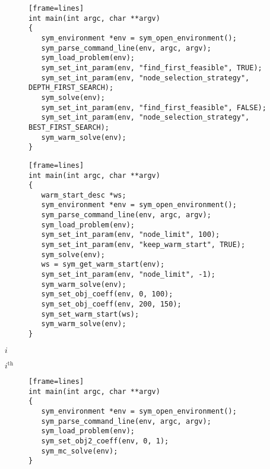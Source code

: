\documentclass[twoside,11pt]{book}
\def\lthtmlcheckvsize{\ifdim\ht\sizebox<\vsize 
  \ifdim\wd\sizebox<\hsize\expandafter\hfill\fi \expandafter\vfill
  \else\expandafter\vss\fi}%
\begin{document}
{\newpage\clearpage
{}%
\begin{figure}{\color{brown}
\begin{Verbatim}
[frame=lines]
int main(int argc, char **argv)
{
   sym_environment *env = sym_open_environment();
   sym_parse_command_line(env, argc, argv);
   sym_load_problem(env);
   sym_set_int_param(env, "find_first_feasible", TRUE);
   sym_set_int_param(env, "node_selection_strategy", DEPTH_FIRST_SEARCH);
   sym_solve(env);
   sym_set_int_param(env, "find_first_feasible", FALSE);
   sym_set_int_param(env, "node_selection_strategy", BEST_FIRST_SEARCH);
   sym_warm_solve(env);
}\end{Verbatim}

}

\end{figure}%
\lthtmlfigureZ
\lthtmlcheckvsize\clearpage}

{\newpage\clearpage
{}%
\begin{figure}{\color{brown}
\begin{Verbatim}
[frame=lines]
int main(int argc, char **argv)
{
   warm_start_desc *ws;
   sym_environment *env = sym_open_environment();
   sym_parse_command_line(env, argc, argv);
   sym_load_problem(env);
   sym_set_int_param(env, "node_limit", 100);
   sym_set_int_param(env, "keep_warm_start", TRUE);
   sym_solve(env);
   ws = sym_get_warm_start(env);
   sym_set_int_param(env, "node_limit", -1);
   sym_warm_solve(env);
   sym_set_obj_coeff(env, 0, 100);
   sym_set_obj_coeff(env, 200, 150);
   sym_set_warm_start(ws);
   sym_warm_solve(env);
}\end{Verbatim}

}

\end{figure}%
\lthtmlfigureZ
\lthtmlcheckvsize\clearpage}

{\newpage\clearpage
{}%
\bgroup\color{brown}$ i$\egroup%
\lthtmlindisplaymathZ
\lthtmlcheckvsize\clearpage}

{\newpage\clearpage
{}%
\bgroup\color{brown}$ i^\textrm{th}$\egroup%
\lthtmlindisplaymathZ
\lthtmlcheckvsize\clearpage}

{\newpage\clearpage
{}%
\begin{figure}{\color{brown}
\begin{Verbatim}
[frame=lines]
int main(int argc, char **argv)
{
   sym_environment *env = sym_open_environment();
   sym_parse_command_line(env, argc, argv);
   sym_load_problem(env);
   sym_set_obj2_coeff(env, 0, 1);
   sym_mc_solve(env);
}\end{Verbatim}

}

\end{figure}%
\lthtmlfigureZ
\lthtmlcheckvsize\clearpage}
\end{document}
